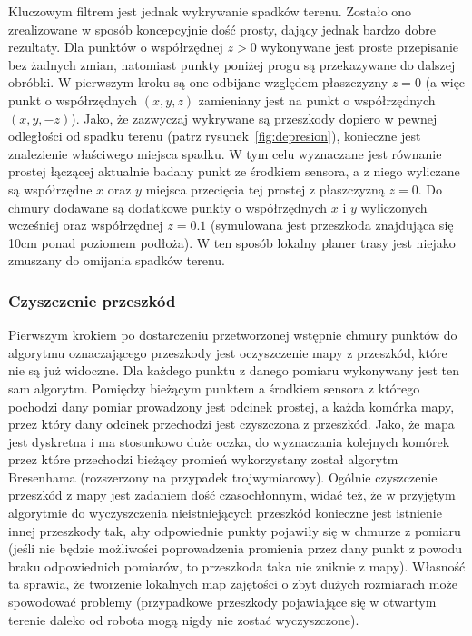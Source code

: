 Kluczowym filtrem jest jednak wykrywanie spadków terenu. Zostało ono zrealizowane
w sposób koncepcyjnie dość prosty, dający jednak bardzo dobre rezultaty. Dla punktów
o współrzędnej $z>0$ wykonywane
jest proste przepisanie bez żadnych zmian, natomiast punkty poniżej progu są przekazywane
do dalszej obróbki. W pierwszym kroku są one odbijane względem płaszczyzny $z=0$
(a więc punkt o współrzędnych $(x, y, z)$ zamieniany jest na punkt o współrzędnych
$(x, y, -z)$). Jako, że zazwyczaj wykrywane są przeszkody dopiero w pewnej
odległości od spadku terenu (patrz rysunek~\ref{fig:depresion}), konieczne jest
znalezienie właściwego miejsca spadku. W tym celu wyznaczane jest równanie prostej
łączącej aktualnie badany punkt ze środkiem sensora, a z niego wyliczane są współrzędne
$x$ oraz $y$ miejsca przecięcia tej prostej z płaszczyzną $z=0$. Do chmury dodawane
są dodatkowe punkty o współrzędnych $x$ i $y$ wyliczonych wcześniej oraz współrzędnej
$z=0.1$ (symulowana jest przeszkoda znajdująca się 10cm ponad poziomem podłoża).
W ten sposób lokalny planer trasy jest niejako zmuszany do omijania spadków terenu.

\subsubsection{Czyszczenie przeszkód}

Pierwszym krokiem po dostarczeniu przetworzonej wstępnie chmury punktów do algorytmu
oznaczającego przeszkody jest oczyszczenie mapy z przeszkód, które nie są już widoczne.
Dla każdego punktu z danego pomiaru wykonywany jest ten sam algorytm. Pomiędzy
bieżącym punktem a środkiem sensora z którego pochodzi dany pomiar prowadzony jest
odcinek prostej, a każda komórka mapy, przez który dany odcinek przechodzi jest
czyszczona z przeszkód. Jako, że mapa jest dyskretna i ma stosunkowo duże oczka,
do wyznaczania kolejnych komórek przez które przechodzi bieżący promień wykorzystany
został algorytm Bresenhama (rozszerzony na przypadek trojwymiarowy). Ogólnie czyszczenie
przeszkód z mapy jest zadaniem dość czasochłonnym, widać też, że w przyjętym algorytmie
do wyczyszczenia nieistniejących przeszkód konieczne jest istnienie innej przeszkody
tak, aby odpowiednie punkty pojawiły się w chmurze z pomiaru (jeśli nie będzie możliwości
poprowadzenia promienia przez dany punkt z powodu braku odpowiednich pomiarów, to
przeszkoda taka nie zniknie z mapy). Własność ta sprawia, że tworzenie lokalnych
map zajętości o zbyt dużych rozmiarach może spowodować problemy (przypadkowe przeszkody
pojawiające się w otwartym terenie daleko od robota mogą nigdy nie zostać wyczyszczone).

